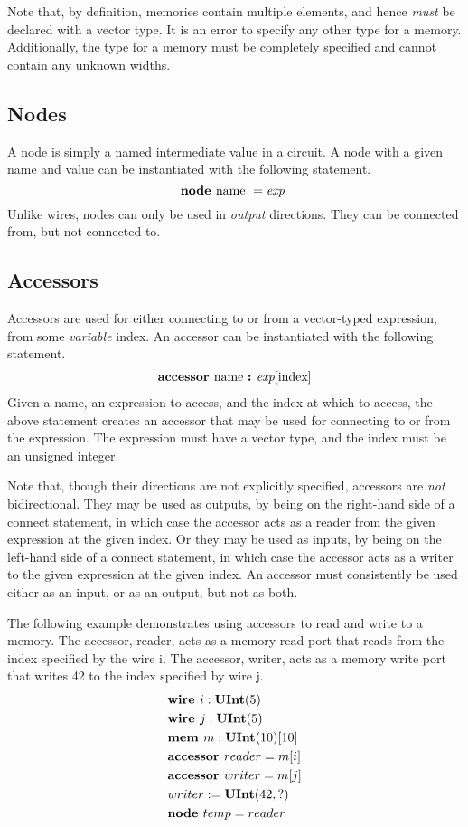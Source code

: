 \documentclass[12pt]{article}
\begin{document}
Note that, by definition, memories contain multiple elements, and hence {\em must} be declared with a vector type.
It is an error to specify any other type for a memory.
Additionally, the type for a memory must be completely specified and cannot contain any unknown widths.

\subsection{Nodes}
A node is simply a named intermediate value in a circuit.
A node with a given name and value can be instantiated with the following statement.
\[
\text{\bf node\ } \text{name } = \text{\em exp\ } \\
\]
Unlike wires, nodes can only be used in {\em output} directions.
They can be connected from, but not connected to.

\subsection{Accessors}
Accessors are used for either connecting to or from a vector-typed expression, from some {\em variable} index.
An accessor can be instantiated with the following statement.
\[
\begin{aligned}
\text{\bf accessor\ } \text{name } \text{\bf :\ } \text{\em exp}[\text{index}] \\
\end{aligned}
\]
Given a name, an expression to access, and the index at which to access, the above statement creates an accessor that may be used for connecting to or from the expression.
The expression must have a vector type, and the index must be an unsigned integer. 

Note that, though their directions are not explicitly specified, accessors are {\em not} bidirectional.
They may be used as outputs, by being on the right-hand side of a connect statement, in which case the accessor acts as a reader from the given expression at the given index.
Or they may be used as inputs, by being on the left-hand side of a connect statement, in which case the accessor acts as a writer to the given expression at the given index.
An accessor must consistently be used either as an input, or as an output, but not as both. 

The following example demonstrates using accessors to read and write to a memory.
The accessor, reader, acts as a memory read port that reads from the index specified by the wire i.
The accessor, writer, acts as a memory write port that writes 42 to the index specified by wire j.
\[
\begin{aligned}
&\text{\bf wire\ } i : \text{\bf UInt}(5) \\
&\text{\bf wire\ } j : \text{\bf UInt}(5) \\
&\text{\bf mem\ } m : \text{\bf UInt}(10)[10] \\
&\text{\bf accessor\ } reader = m[i] \\
&\text{\bf accessor\ } writer = m[j] \\
&writer := \text{\bf UInt}(42, ?) \\
&\text{\bf node\ } temp = reader \\
\end{aligned}
\]
\end{document}
